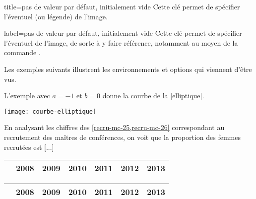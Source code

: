 \begin{docKey}{title}{=}{pas de valeur par défaut,
    initialement vide}
  Cette clé permet de spécifier l'éventuel  (ou légende) de l'image.
\end{docKey}
\begin{docKey}{label}{=}{pas de valeur par défaut, initialement
    vide}
  Cette clé permet de spécifier l'éventuel  de l'image, de sorte
  à y faire référence, notamment au moyen de la commande .
\end{docKey}

Les exemples suivants illustrent les environnements et options qui viennent
d'être vus.

\begin{bodycode}[listing options={morekeywords={[2]title,label}}]
  L'exemple avec $a=-1$ et $b=0$ donne la courbe de la \vref{elliptique}.
%
  \begin{gztfigure}[title=Courbe elliptique correspondant à l'équation
    $y^2=x^3-x$,label=elliptique]
    \texttt{[image: courbe-elliptique]}
  \end{gztfigure}
\end{bodycode}

\begin{bodycode}[listing options={morekeywords={[2]title,label},deletekeywords={[3]section}}]
  En analysant les chiffres des \vref{recru-mc-25,recru-mc-26} correspondant au
  recrutement des maîtres de conférences, on voit que la proportion des femmes
  recrutées est [...]
%
  \begin{gzttable*}[label=recru-mc-25,title=Recrutement des maîtres de
    conférences section 25]
    \begin{tabular}{|l|cccccc|}
      \hline
      & 2008 & 2009 & 2010 & 2011 & 2012 & 2013 \\ \hline
      [...]
    \end{tabular}
  \end{gzttable*}
%
  \begin{gzttable*}[label=recru-mc-26,title=Recrutement des maîtres de
    conférences section 26]
    \begin{tabular}{|l|cccccc|}
      \hline
      & 2008 & 2009 & 2010 & 2011 & 2012 & 2013 \\ \hline
      [...]
    \end{tabular}
  \end{gzttable*}
\end{bodycode}

